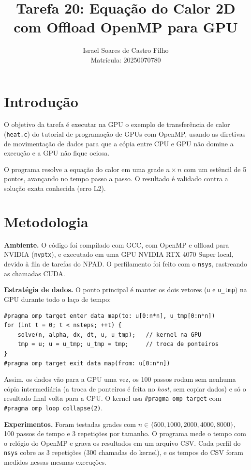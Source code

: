 \documentclass[a4paper,12pt]{article}
\title{Tarefa 20: Equação do Calor 2D com Offload OpenMP para GPU}
\author{Israel Soares de Castro Filho \\ Matrícula: 20250070780}
\date{}
\begin{document}
\maketitle

\section{Introdução}

O objetivo da tarefa é executar na GPU o exemplo de transferência de calor
(\texttt{heat.c}) do tutorial de programação de GPUs com OpenMP, usando as
diretivas de movimentação de dados para que a cópia entre CPU e GPU não domine
a execução e a GPU não fique ociosa.

O programa resolve a equação do calor em uma grade $n \times n$ com um estêncil
de 5 pontos, avançando no tempo passo a passo. O resultado é validado contra a
solução exata conhecida (erro L2).

\section{Metodologia}

\textbf{Ambiente.} O código foi compilado com GCC, com OpenMP e offload para
NVIDIA (\texttt{nvptx}), e executado em uma GPU NVIDIA RTX 4070 Super local,
devido à fila de tarefas do NPAD. O perfilamento foi feito com o \texttt{nsys},
rastreando as chamadas CUDA.

\textbf{Estratégia de dados.} O ponto principal é manter os dois vetores
(\texttt{u} e \texttt{u\_tmp}) na GPU durante todo o laço de tempo:

\begin{lstlisting}[style=cstyle, caption={Diretivas de movimentação de dados}]
#pragma omp target enter data map(to: u[0:n*n], u_tmp[0:n*n])
for (int t = 0; t < nsteps; ++t) {
    solve(n, alpha, dx, dt, u, u_tmp);   // kernel na GPU
    tmp = u; u = u_tmp; u_tmp = tmp;     // troca de ponteiros
}
#pragma omp target exit data map(from: u[0:n*n])
\end{lstlisting}

Assim, os dados vão para a GPU uma vez, os 100 passos rodam sem nenhuma cópia
intermediária (a troca de ponteiros é feita no \textit{host}, sem copiar dados)
e só o resultado final volta para a CPU. O kernel usa
\texttt{\#pragma omp target} com \texttt{\#pragma omp loop collapse(2)}.

\textbf{Experimentos.} Foram testadas grades com $n \in \{500, 1000, 2000, 4000,
8000\}$, 100 passos de tempo e 3 repetições por tamanho. O programa mede o tempo
com o relógio do OpenMP e grava os resultados em um arquivo CSV. Cada perfil
do \texttt{nsys} cobre as 3 repetições (300 chamadas do kernel), e os tempos do CSV
foram medidos nessas mesmas execuções.
\end{document}
